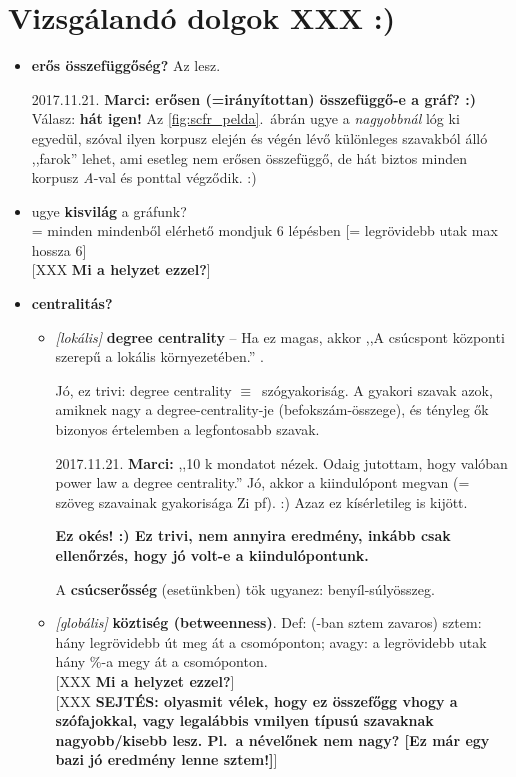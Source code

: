 \documentclass{llncs}
\newcommand{\embf}[1]{\textbf{#1}}
\newcommand{\XXX}[1]{{\small \color{megjcolor} [XXX #1]}}
\newcommand{\XXXb}[1]{\XXX{\embf{#1}}}
\newcommand{\azonos}{\ensuremath{\equiv}\ }
\begin{document}
\section{Vizsgálandó dolgok XXX :)}

\begin{itemize}
\setlength\itemsep{1em}

\item
\embf{erős összefüggőség?}
Az lesz.

2017.11.21. \embf{Marci: erősen (=irányítottan) összefüggő-e a gráf? :)}
Válasz: \embf{hát igen!}
Az \ref{fig:scfr_pelda}.\ ábrán ugye a \emph{nagyobbnál} lóg ki egyedül,
szóval ilyen korpusz elején és végén lévő
különleges szavakból álló ,,farok'' lehet,
ami esetleg nem erősen összefüggő,
de hát biztos minden korpusz \emph{A}-val és ponttal végződik. :)

\item
ugye \embf{kisvilág} a gráfunk?\\
= minden mindenből elérhető mondjuk 6 lépésben
[= legrövidebb utak max hossza 6]\\
\XXXb{Mi a helyzet ezzel?}

\item
\embf{centralitás?}

\begin{itemize}

\item
\emph{[lokális]} \embf{degree centrality} --
Ha ez magas, akkor
,,A csúcspont központi szerepű a lokális környezetében.''
\cite{kovacs2012magyar}.

Jó, ez trivi:
degree centrality \azonos szógyakoriság.
A gyakori szavak azok, amiknek nagy
a degree-centrality-je (befokszám-összege),
és tényleg ők bizonyos értelemben a legfontosabb szavak.

2017.11.21. \embf{Marci:}
,,10 k mondatot nézek.
Odaig jutottam, hogy valóban power law a degree centrality.''
Jó, akkor a kiindulópont megvan (= szöveg szavainak gyakorisága Zi pf). :)
Azaz ez kísérletileg is kijött.

\embf{Ez okés! :) Ez trivi, nem annyira eredmény,
inkább csak ellenőrzés, hogy jó volt-e a kiindulópontunk.}

A \embf{csúcserősség} (esetünkben) tök ugyanez: benyíl-súlyösszeg.

\item
\emph{[globális]} \embf{köztiség (betweenness)}.
Def: (\cite{kovacs2012magyar}-ban sztem zavaros)
sztem: hány legrövidebb út meg át a csomóponton;
avagy: a legrövidebb utak hány \%-a megy át a csomóponton.\\
\XXXb{Mi a helyzet ezzel?}\\
\XXXb{SEJTÉS: olyasmit vélek, hogy ez összefőgg vhogy a szófajokkal,
vagy legalábbis vmilyen típusú szavaknak nagyobb/kisebb lesz.
Pl.\ a névelőnek nem nagy? [Ez már egy bazi jó eredmény lenne sztem!]}


\end{itemize}
\end{itemize}
\end{document}
